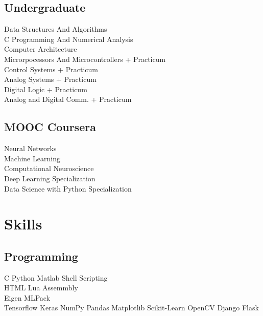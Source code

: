 \documentclass[]{deedy-resume-openfont}
\begin{document}
\begin{minipage}[t]{0.33\textwidth}
\subsection{Undergraduate}
Data Structures And Algorithms \\
C Programming And Numerical Analysis \\
Computer Architecture \\
Microrpocessors And Microcontrollers + Practicum \\
Control Systems + Practicum \\
Analog Systems + Practicum \\
Digital Logic + Practicum \\
Analog and Digital Comm. + Practicum \\ 
\sectionsep

\subsection{MOOC Coursera}
Neural Networks \\
Machine Learning \\
Computational Neuroscience \\
Deep Learning Specialization \\
Data Science with Python Specialization \\


\section{Skills}
\subsection{Programming}
C \textbullet{} Python \textbullet{} Matlab \textbullet{} Shell Scripting \\
HTML \textbullet{} Lua \textbullet{} Assemmbly \\
Eigen \textbullet{} MLPack \\
Tensorflow \textbullet{} Keras \textbullet{} NumPy \textbullet{} Pandas \textbullet{} Matplotlib \textbullet{} Scikit-Learn \textbullet{} OpenCV \textbullet{} Django \textbullet{} Flask
\sectionsep

%
%

\end{minipage} 
\end{document}
